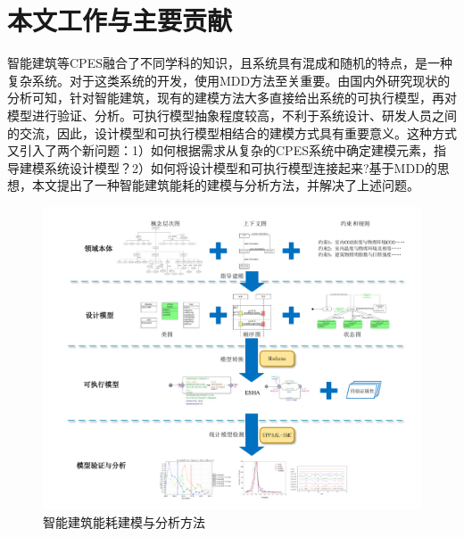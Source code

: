 \section{本文工作与主要贡献}	
	智能建筑等CPES融合了不同学科的知识，且系统具有混成和随机的特点，是一种复杂系统。对于这类系统的开发，使用MDD方法至关重要。由国内外研究现状的分析可知，针对智能建筑，现有的建模方法大多直接给出系统的可执行模型，再对模型进行验证、分析。可执行模型抽象程度较高，不利于系统设计、研发人员之间的交流，因此，设计模型和可执行模型相结合的建模方式具有重要意义。这种方式又引入了两个新问题：1）如何根据需求从复杂的CPES系统中确定建模元素，指导建模系统设计模型？2）如何将设计模型和可执行模型连接起来?基于MDD的思想，本文提出了一种智能建筑能耗的建模与分析方法，并解决了上述问题。
	
	
	
	
	\begin{figure}[!t]
	\centering
	\includegraphics[width=6in]{framework.pdf}
	\caption{智能建筑能耗建模与分析方法}
	\label{approach-framework}
	\end{figure}
	
